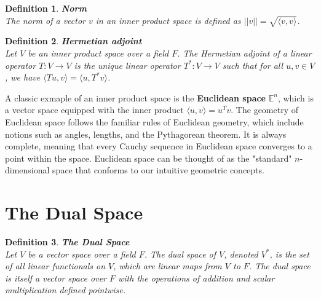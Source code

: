 \documentclass[11pt]{book} %
\newtheorem{definition}{Definition}[section]
\begin{document}
\begin{definition}{\textbf{Norm}} \\
    The norm of a vector \( v \) in an inner product space is defined as \( ||v|| = \sqrt{\langle v, v \rangle} \).
\end{definition}


\begin{definition}{\textbf{Hermetian adjoint}} \\
    Let \( V \) be an inner product space over a field \( F \). 
    The Hermetian adjoint of a linear operator \( T: V \to V \) is the unique linear operator \( T^*: V \to V \) such that for all \( u, v \in V \), we have \( \langle Tu, v \rangle = \langle u, T^*v \rangle \).
\end{definition}

A classic exmaple of an inner product space is the \textbf{Euclidean space} \( \mathbb{E}^n \), which is a vector space equipped with 
the inner product \( \langle u, v \rangle = u^T v \).
The geometry of Euclidean space follows the familiar rules of Euclidean geometry, which include notions such as angles, lengths, and the Pythagorean theorem.
It is always complete, meaning that every Cauchy sequence in Euclidean space converges to a point within the space.
Euclidean space can be thought of as the "standard" \( n \)-dimensional space that conforms to our intuitive geometric concepts.


\section{The Dual Space}

\begin{definition}{\textbf{The Dual Space}} \\
    Let \( V \) be a vector space over a field \( F \). The dual space of \( V \), denoted \( V^* \), is the set of all linear functionals on \( V \), 
    which are linear maps from \( V \) to \( F \). The dual space is itself a vector space over \( F \) with the operations of addition and scalar multiplication defined pointwise.
\end{definition}








\end{document}
